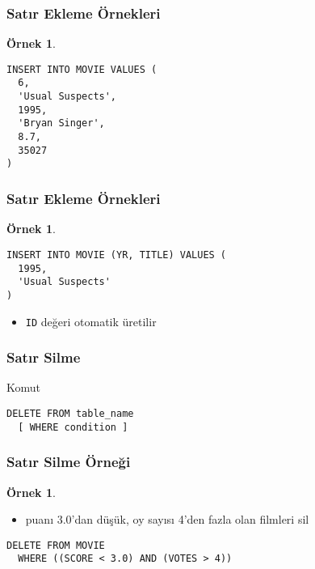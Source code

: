 \documentclass[dvipsnames]{beamer}
\theoremstyle{definition}
\theoremstyle{example}
\newtheorem{ornek}[theorem]{Örnek}
\theoremstyle{plain}
\begin{document}
\begin{frame}[fragile]
  \frametitle{Satır Ekleme Örnekleri}

  \begin{ornek}
    \begin{lstlisting}
INSERT INTO MOVIE VALUES (
  6,
  'Usual Suspects',
  1995,
  'Bryan Singer',
  8.7,
  35027
)
    \end{lstlisting}
  \end{ornek}
\end{frame}

\begin{frame}[fragile]
  \frametitle{Satır Ekleme Örnekleri}

  \begin{ornek}
    \begin{lstlisting}
INSERT INTO MOVIE (YR, TITLE) VALUES (
  1995,
  'Usual Suspects'
)
    \end{lstlisting}

    \pause
    \begin{itemize}
      \item \texttt{ID} değeri otomatik üretilir
    \end{itemize}
  \end{ornek}
\end{frame}

\begin{frame}[fragile]
  \frametitle{Satır Silme}

  \begin{block}{Komut}
    \begin{lstlisting}
DELETE FROM table_name
  [ WHERE condition ]
    \end{lstlisting}
  \end{block}
\end{frame}

\begin{frame}[fragile]
  \frametitle{Satır Silme Örneği}

  \begin{ornek}
    \begin{itemize}
      \item puanı 3.0'dan düşük, oy sayısı 4'den fazla olan filmleri sil
    \end{itemize}

    \begin{lstlisting}
DELETE FROM MOVIE
  WHERE ((SCORE < 3.0) AND (VOTES > 4))
    \end{lstlisting}
  \end{ornek}
\end{frame}
\end{document}
